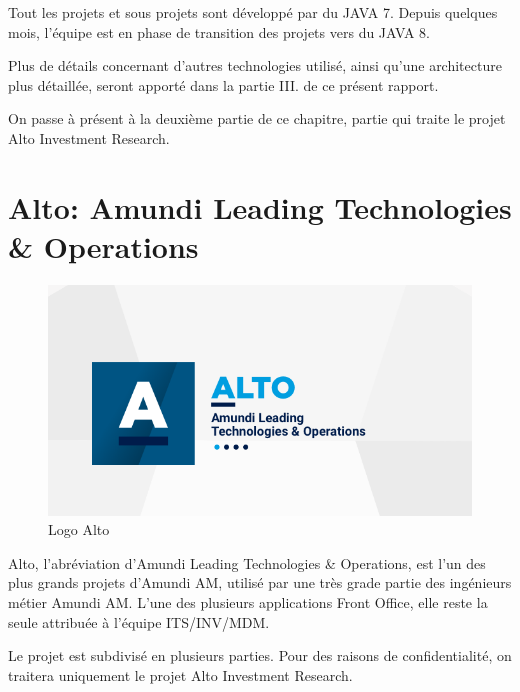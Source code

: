 \par Tout les projets et sous projets sont développé par du JAVA 7. Depuis quelques mois, l'équipe est en phase de transition des projets vers du JAVA 8.
\par Plus de détails concernant d'autres technologies utilisé, ainsi qu'une architecture plus détaillée, seront apporté dans la partie III. de ce présent rapport.
\par On passe à présent à la deuxième partie de ce chapitre, partie qui traite le projet Alto Investment Research.
\pagebreak
\section{Alto: Amundi Leading Technologies \& Operations}
\begin{figure}[ht]
    \centering
    \includegraphics[width=\columnwidth]{img/Alto.png}
    \caption{Logo Alto}
    \label{fig:altoLogo}
\end{figure}
\par Alto, l'abréviation d'Amundi Leading Technologies \& Operations, est l'un des plus grands projets d'Amundi AM, utilisé par une très grade partie des ingénieurs métier Amundi AM. L'une des plusieurs applications Front Office, elle reste la seule attribuée à l'équipe ITS/INV/MDM.
\par Le projet est subdivisé en plusieurs parties. Pour des raisons de confidentialité, on traitera uniquement le projet Alto Investment Research.
